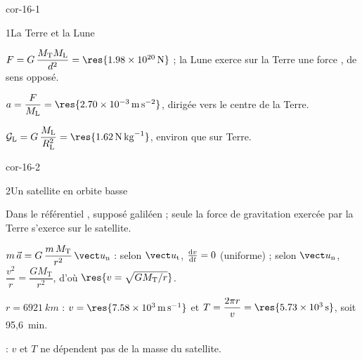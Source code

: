 \corrigesSouples

\begin{blocLivre}{cor-16-1}
\begin{corrige}{1}{La Terre et la Lune}
\begin{questions}
\item $F=G\,\dfrac{M_\mathrm{T}M_\mathrm{L}}{d^2}=\res{\qty{1,98e20}{N}}$ ; la Lune exerce sur la Terre une force
, de sens opposé.
\item $a=\dfrac{F}{M_\mathrm{L}}=\res{\qty{2,70e-3}{m.s^{-2}}}$, dirigée vers le centre de la Terre.
\item $\mathcal{G}_\mathrm{L}=G\,\dfrac{M_\mathrm{L}}{R_\mathrm{L}^2}=\res{\qty{1,62}{N.kg^{-1}}}$, environ  que sur Terre.
\end{questions}
\end{corrige}
\end{blocLivre}
\begin{blocLivre}{cor-16-2}
\begin{corrige}{2}{Un satellite en orbite basse}
\begin{questions}
\item Dans le référentiel , supposé galiléen ; seule la force de gravitation exercée par la Terre
s'exerce sur le satellite.
\item $m\,\vec{a}=G\,\dfrac{m\,M_\mathrm{T}}{r^2}\,\un$ : selon $\ut$, $\frac{\mathrm{d}v}{\mathrm{d}t}=0$ (uniforme) ; selon $\un$,
$\dfrac{v^2}{r}=\dfrac{GM_\mathrm{T}}{r^2}$, d'où $\res{v=\sqrt{GM_\mathrm{T}/r}}$.
\item $r=\qty{6921}{km}$ : $v=\res{\qty{7,58e3}{m.s^{-1}}}$ et $T=\dfrac{2\pi r}{v}=\res{\qty{5,73e3}{s}}$, soit 95,6~min.
\item {} : $v$ et $T$ ne dépendent pas de la masse du satellite.
\end{questions}
\end{corrige}
\end{blocLivre}
